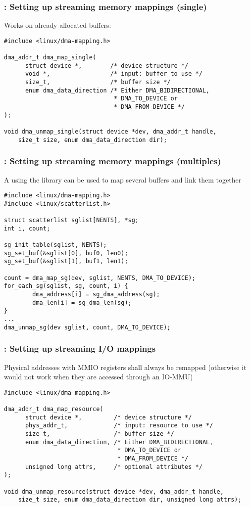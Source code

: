\begin{frame}[fragile]
  \frametitle{: Setting up streaming memory mappings (single)}
  Works on already allocated buffers:
  \vfill
\begin{verbatim}
#include <linux/dma-mapping.h>

dma_addr_t dma_map_single(
      struct device *,        /* device structure */
      void *,                 /* input: buffer to use */
      size_t,                 /* buffer size */
      enum dma_data_direction /* Either DMA_BIDIRECTIONAL,
                               * DMA_TO_DEVICE or
                               * DMA_FROM_DEVICE */
);

void dma_unmap_single(struct device *dev, dma_addr_t handle,
    size_t size, enum dma_data_direction dir);
\end{verbatim}
\end{frame}

\begin{frame}[fragile]
  \frametitle{: Setting up streaming memory mappings (multiples)}
  A  using the  library can be
  used to map several buffers and link them together
  \vfill
\begin{verbatim}
#include <linux/dma-mapping.h>
#include <linux/scatterlist.h>

struct scatterlist sglist[NENTS], *sg;
int i, count;

sg_init_table(sglist, NENTS);
sg_set_buf(&sglist[0], buf0, len0);
sg_set_buf(&sglist[1], buf1, len1);

count = dma_map_sg(dev, sglist, NENTS, DMA_TO_DEVICE);
for_each_sg(sglist, sg, count, i) {
        dma_address[i] = sg_dma_address(sg);
        dma_len[i] = sg_dma_len(sg);
}
...
dma_unmap_sg(dev sglist, count, DMA_TO_DEVICE);
\end{verbatim}
\end{frame}

\begin{frame}[fragile]
  \frametitle{: Setting up streaming I/O mappings}
  Physical addresses with MMIO registers shall always be remapped
  (otherwise it would not work when they are accessed through an IO-MMU)
  \vfill
\begin{verbatim}
#include <linux/dma-mapping.h>

dma_addr_t dma_map_resource(
      struct device *,         /* device structure */
      phys_addr_t,             /* input: resource to use */
      size_t,                  /* buffer size */
      enum dma_data_direction, /* Either DMA_BIDIRECTIONAL,
                                * DMA_TO_DEVICE or
                                * DMA_FROM_DEVICE */
      unsigned long attrs,     /* optional attributes */
);

void dma_unmap_resource(struct device *dev, dma_addr_t handle,
    size_t size, enum dma_data_direction dir, unsigned long attrs);
\end{verbatim}
\end{frame}

